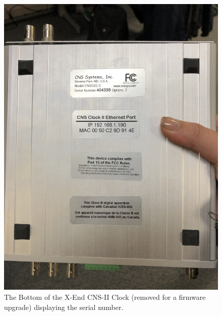 \documentclass{article}
\begin{document}
\begin{figure}
	\begin{center}
		\includegraphics[width=0.8\linewidth]{img/cns-ii-ex-bottom-view.jpeg}
	\end{center}
	\caption{The Bottom of the X-End CNS-II Clock (removed for a firmware upgrade) displaying the serial number.}
	\label{fig:cns-ii-ex-bottom}
\end{figure}
\end{document}

